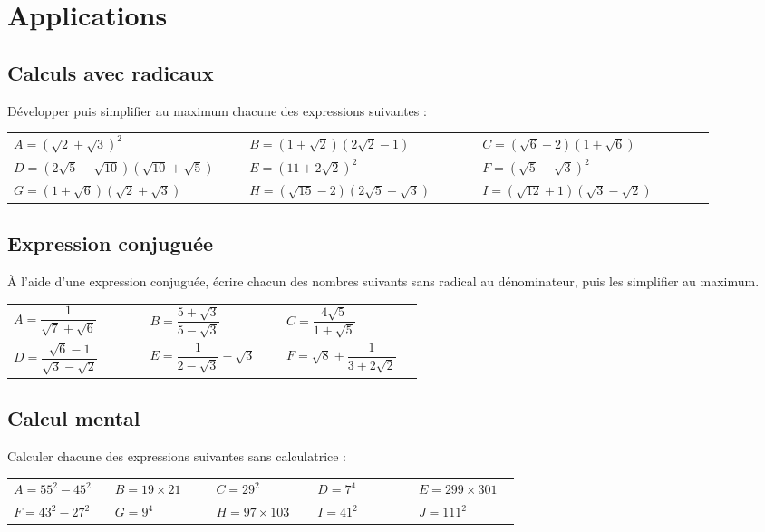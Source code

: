 \documentclass[oneside,12pt]{article}          %
\begin{document}
\section{Applications}

\subsection{Calculs avec radicaux}
Développer puis simplifier au maximum chacune des expressions suivantes :

\begin{tabular}{p{0.3\linewidth} p{0.3\linewidth} p{0.3\linewidth}}
	$A=(\sqrt{2}+\sqrt{3})^2$ & $B=(1+\sqrt{2})(2\sqrt2-1)$ & $C=(\sqrt6-2)(1+\sqrt6)$ \\
	$D=(2\sqrt5-\sqrt{10})(\sqrt{10}+\sqrt5)$ & $E=(11+2\sqrt2)^2$ & $F=(\sqrt5-\sqrt3)^2$ \\
	$G=(1+\sqrt6)(\sqrt2+\sqrt3)$ & $H=(\sqrt{15}-2)(2\sqrt5+\sqrt3)$ & $I=(\sqrt{12}+1)(\sqrt3-\sqrt2)$ 
\end{tabular}



\subsection{Expression conjuguée}
À l'aide d'une expression conjuguée, écrire chacun des nombres suivants sans radical au dénominateur, puis les simplifier au maximum.

\renewcommand{\arraystretch}{2}
\begin{tabular}{p{0.3\linewidth} p{0.3\linewidth} p{0.3\linewidth}}
    $A=\dfrac{1}{\sqrt{7}+\sqrt{6}}$ & $B=\dfrac{5+\sqrt{3}}{5-\sqrt{3}}$ & $C=\dfrac{4\sqrt{5}}{1+\sqrt{5}}$ \\
    $D=\dfrac{\sqrt{6}-1}{\sqrt{3}-\sqrt{2}}$ & $E=\dfrac{1}{2-\sqrt{3}}-\sqrt{3}$ & $F=\sqrt{8}+\dfrac{1}{3+2\sqrt{2}}$
\end{tabular}



\subsection{Calcul mental}
Calculer chacune des expressions suivantes sans calculatrice :

\renewcommand{\arraystretch}{1.5}
\begin{tabular}{p{0.18\linewidth} p{0.18\linewidth} p{0.18\linewidth} p{0.18\linewidth} p{0.18\linewidth}}
	$A=55^2-45^2$ & $B=19\times21$ & $C=29^2$ &	$D=7^4$ & $E=299\times301$ \\
	$F=43^2-27^2$ & $G=9^4$ & $H=97\times103$ & $I=41^2$ & $J=111^2$
\end{tabular}
\end{document}
